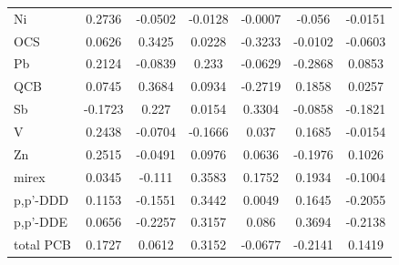 \begin{table}[htbp]
\begin{tabular}{lcccccc}
        Ni & 0.2736 & -0.0502 & -0.0128 & -0.0007 & -0.056 & -0.0151 \\
        OCS & 0.0626 & 0.3425 & 0.0228 & -0.3233 & -0.0102 & -0.0603 \\
        Pb & 0.2124 & -0.0839 & 0.233 & -0.0629 & -0.2868 & 0.0853 \\
        QCB & 0.0745 & 0.3684 & 0.0934 & -0.2719 & 0.1858 & 0.0257 \\
        Sb & -0.1723 & 0.227 & 0.0154 & 0.3304 & -0.0858 & -0.1821 \\
        V & 0.2438 & -0.0704 & -0.1666 & 0.037 & 0.1685 & -0.0154 \\
        Zn & 0.2515 & -0.0491 & 0.0976 & 0.0636 & -0.1976 & 0.1026 \\
        mirex & 0.0345 & -0.111 & 0.3583 & 0.1752 & 0.1934 & -0.1004 \\
        p,p'-DDD & 0.1153 & -0.1551 & 0.3442 & 0.0049 & 0.1645 & -0.2055 \\
        p,p'-DDE & 0.0656 & -0.2257 & 0.3157 & 0.086 & 0.3694 & -0.2138 \\
        total PCB & 0.1727 & 0.0612 & 0.3152 & -0.0677 & -0.2141 & 0.1419 \\
        \bottomrule
    \end{tabular}
\end{table}
